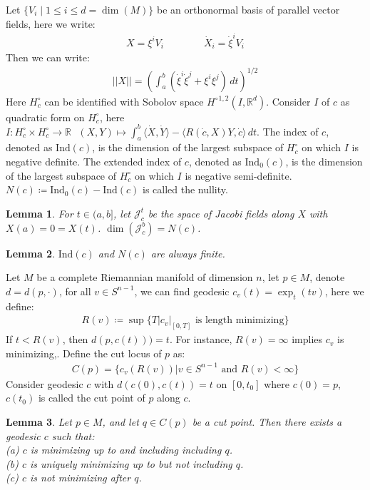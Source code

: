 \documentclass[11pt]{book}
\theoremstyle{break}
\theoremstyle{break}
\newtheorem{lem}{Lemma}[thm]
\newcommand{\R}{\mathbb{R}}
\begin{document}
Let $\{V_i\mid 1\leq i \leq d = \dim(M)\}$ be an orthonormal basis of parallel vector fields, here we write:
\begin{align*}
X = \xi^i V_i \qquad\qquad \dot{X}_i  = \dot{\xi}^i V_i
\end{align*}
Then we can write:
\begin{align*}
||X|| = \left( \int_a^b \left( \dot{\xi}^i \dot{\xi}^j + \xi^i \xi^j\right) \, dt\right)^{1/2}
\end{align*}
Here $H_c^\circ$ can be identified with Sobolov space ${H^\circ}^{1,2}(I,\R^d)$. Consider $I$ of $c$ as quadratic form on $H^\circ_c$, here $I: H_c^\circ \times H_c^\circ \to \R \ \ \ (X,Y)\mapsto \int_a^b \langle \dot{X},\dot{ Y}\rangle - \langle R(\dot{c}, X)Y,\dot{c}\rangle \, dt$. The index of $c$, denoted as $\text{Ind}(c)$, is the dimension of the largest subspace of $H_c^\circ$ on which $I$ is negative definite. The extended index of $c$, denoted as $\text{Ind}_0(c)$, is the dimension of the largest subspace of $H_c^\circ$ on which $I$ is negative semi-definite. $N(c) \coloneqq \text{Ind}_0(c) - \text{Ind}(c)$ is called the nullity. 
\begin{lem}
For $t \in (a,b]$, let $\mathcal{J}_c^t$ be the space of Jacobi fields along $X$ with $X(a) = 0 = X(t)$. $\dim(\mathcal{J}_c^b) = N(c)$. 
\end{lem} 

\begin{lem}
$\text{Ind}(c)$ and $N(c)$ are always finite.
\end{lem}


Let $M$ be a complete Riemannian manifold of dimension $n$, let $p \in M$, denote $d = d(p,\cdot)$, for all $v \in S^{n-1}$, we can find geodesic $c_v(t) = \exp_t(tv)$, here we define:
\begin{align*}
R(v) \coloneqq \sup\{ T | c_v|_{[0,T]} \text{ is length minimizing}\}
\end{align*}
If $t< R(v)$, then $d(p,c(t))) = t$. For instance, $R(v) = \infty$ implies $c_v$ is minimizing,. Define the cut locus of $p$ as:
\begin{align*}
C(p) = \{c_v (R(v)) | v \in S^{n-1} \text{ and }R(v) <\infty \}
\end{align*}
Consider geodesic $c$ with $d(c(0),c(t)) = t$ on $[0,t_0]$ where $c(0) = p$, $c(t_0)$ is called the cut point of $p$ along $c$. \\

\begin{lem}
Let $p \in M$, and let $q \in C(p)$ be a cut point. Then there exists a geodesic $c$ such that:\\ 
(a) $c$ is minimizing up to and including including $q$. \\
(b) $c$ is uniquely minimizing up to but not including $q$.\\
(c) $c$ is not minimizing after $q$.  
\end{lem}
\end{document}
